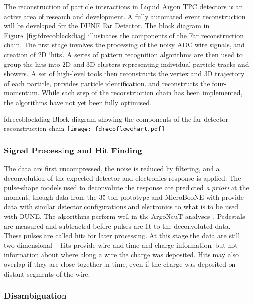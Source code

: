 The reconstruction of particle interactions in Liquid Argon TPC
detectors is an active area of research and development.
A fully automated event reconstruction will be developed for the
DUNE Far Detector. The block diagram in Figure~\ref{fig:fdrecoblockdiag}
illustrates the components of the Far reconstruction chain. 
The first stage involves the processing of the noisy ADC wire signals,
and creation of 2D `hits'. A series of pattern recognition algorithms
are then used to group the hits into 2D and 3D clusters representing 
individual particle tracks and showers. A set of high-level tools
then reconstructs the vertex and 3D trajectory of each particle,
provides particle identification, and reconstructs the four-momentum.
While each step of the reconstruction chain has been implemented,
the algorithms have not yet been fully optimised.

\begin{cdrfigure}{fdrecoblockdiag}
{Block diagram showing the components of the far detector reconstruction chain}
\texttt{[image: fdrecoflowchart.pdf]}
\end{cdrfigure}

\subsubsection{Signal Processing and Hit Finding}

The data are first uncompressed, the noise is reduced by filtering, and a deconvolution
of the expected detector and electronics response is applied.  The pulse-shape models
used to deconvolute the response are predicted {\it a priori} at the moment, though
data from the 35-ton prototype and MicroBooNE with provide data with similar detector
configurations and electronics to what is to be used with DUNE.  The algorithms perform
well in the ArgoNeuT analyses~\cite{Anderson:2012vc}.  Pedestals are measured and
subtracted before pulses are fit to the deconvoluted data.  These pulses are called
hits for later processing.  At this stage the data are still two-dimensional -- hits
provide wire and time and charge information, but not information about where along a wire
the charge was deposited.  Hits may also overlap if they are close together in time, 
even if the charge was deposited on distant segments of the wire.

\subsubsection{Disambiguation}

